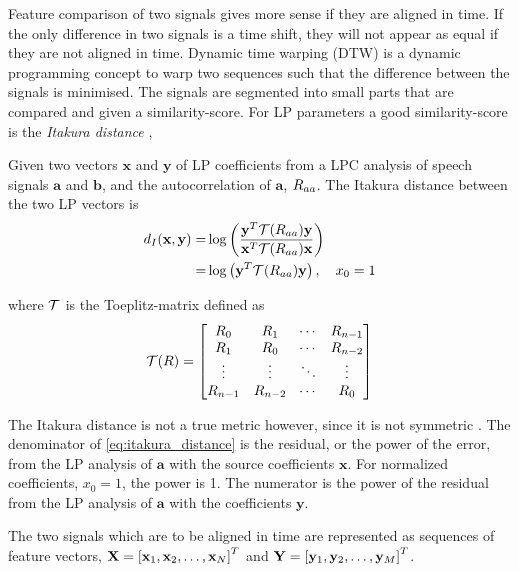 Feature comparison of two signals gives more sense if they are aligned in time. If the only difference in two signals is a time shift, they will not appear as equal if they are not aligned in time. Dynamic time warping (DTW) is a dynamic programming concept to warp two sequences such that the difference between the signals is minimised. The signals are segmented into small parts that are compared and given a similarity-score. For LP parameters a good similarity-score is the \emph{Itakura distance} \cite{itakura75min},
\newcommand{\ita}{d_{I}}
\begin{definition}
	Given two vectors $\mathbf{x}$ and $\mathbf{y}$ of LP coefficients from a LPC analysis of speech signals $\mathbf{a}$ and $\mathbf{b}$, and the autocorrelation of $\mathbf{a}$, $R_{aa}$. The Itakura distance between the two LP vectors is
	\begin{equation}
		\label{eq:itakura_distance}
		\begin{split}
			\ita(\mathbf{x},\mathbf{y}) = & \log\pbrackets{\frac{\mathbf{y}^T \ttt(\auto_{aa}) \mathbf{y}}{\mathbf{x}^T \ttt(\auto_{aa}) \mathbf{x}}} \\
			 = & \log\pbrackets{\mathbf{y}^T \ttt(\auto_{aa}) \mathbf{y}}, \quad x_0 = 1
		\end{split}
	\end{equation}
\end{definition}
where $\mathcal T$ is the Toeplitz-matrix defined as 
\begin{equation}
	\label{eq:toeplitz}
	\mathcal T(R) = 
	\begin{bmatrix}
		R_0 & R_1 & \dotsi & R_{n-1} 	\\
		R_1 & R_0 & \dotsi & R_{n-2} \\
		\vdots & \vdots & \ddots & \vdots \\
		R_{n-1} & R_{n-2} & \dotsi & R_{0}
	\end{bmatrix}
\end{equation}	

The Itakura distance is not a true metric however, since it is not symmetric \cite{kreyszig89}. The denominator of \eqref{eq:itakura_distance} is the residual, or the power of the error, from the LP analysis of $\mathbf{a}$ with the source coefficients $\mathbf{x}$. For normalized coefficients, $x_0 = 1$, the power is 1. The numerator is the power of the residual from the LP analysis of $\mathbf{a}$ with the coefficients $\mathbf{y}$. 

The two signals which are to be aligned in time are represented as sequences of feature vectors, $\mathbf{X}=\left[\mathbf{x}_1,\mathbf{x}_2,\dotsc,\mathbf{x}_N\right]^T$ and $\mathbf{Y}=\left[\mathbf{y}_1,\mathbf{y}_2,\dotsc,\mathbf{y}_M\right]^T$. 

